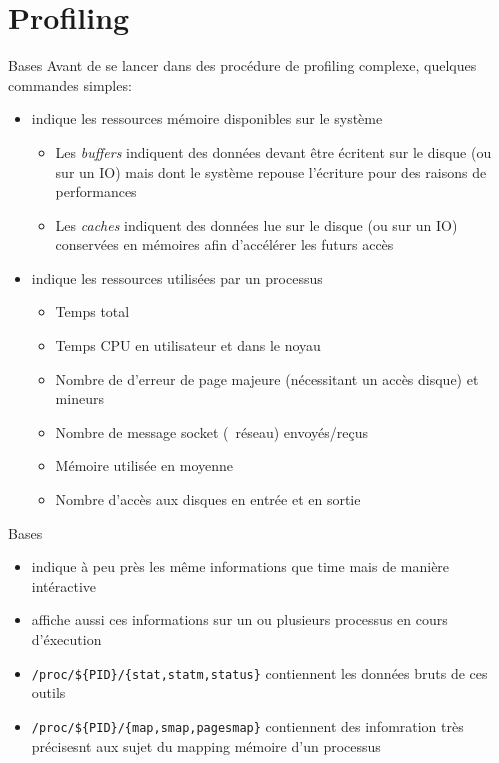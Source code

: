 \section{Profiling}

\begin{frame}[fragile=singleslide]{Bases}
  Avant  de  se  lancer  dans  des procédure  de  profiling  complexe,
  quelques commandes simples:
  \begin{itemize}
  \item {}  indique les ressources mémoire  disponibles sur le
    système
    \begin{itemize}
    \item  Les  \emph{buffers}   indiquent  des  données  devant  être
      écritent  sur le  disque (ou  sur un  IO) mais  dont  le système
      repouse l'écriture pour des raisons de performances
    \item Les  \emph{caches} indiquent des  données lue sur  le disque
      (ou  sur un  IO)  conservées en  mémoires  afin d'accélérer  les
      futurs accès
    \end{itemize}
  \item {} indique les ressources utilisées par un processus
    \begin{itemize}
    \item Temps total
    \item Temps CPU en utilisateur et dans le noyau
    \item  Nombre de d'erreur  de page  majeure (nécessitant  un accès
      disque) et mineurs
    \item Nombre de message socket (~réseau) envoyés/reçus
    \item Mémoire utilisée en moyenne
    \item Nombre d'accès aux disques en entrée et en sortie
    \end{itemize}
  \end{itemize}
\end{frame}

\begin{frame}[fragile=singleslide]{Bases}
  \begin{itemize}
  \item {}  indique à peu  près les même informations  que time
    mais de manière intéractive
  \item {}  affiche aussi ces  informations sur un  ou plusieurs
    processus en cours d'éxecution
  \item    \verb+/proc/${PID}/{stat,statm,status}+   contiennent   les
    données bruts de ces outils
  \item    \verb+/proc/${PID}/{map,smap,pagesmap}+   contiennent   des
    infomration  très précisesnt  aux  sujet du  mapping mémoire  d'un
    processus
  \end{itemize}
\end{frame}

